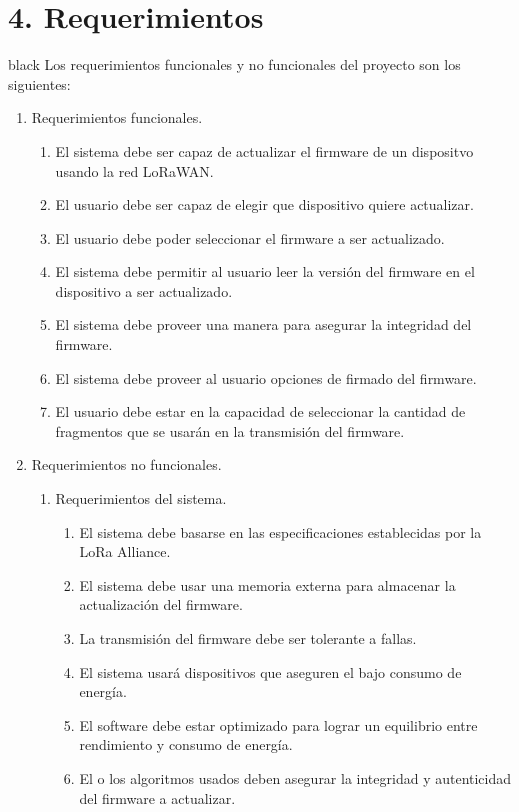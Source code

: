 \documentclass[11pt]{charter}
\begin{document}
\section{4. Requerimientos}
\label{sec:requerimientos}
\begin{consigna}{black}
Los requerimientos funcionales y no funcionales del proyecto son los siguientes:
\begin{enumerate}
\item Requerimientos funcionales.
	\begin{enumerate}
	\item El sistema debe ser capaz de actualizar el firmware de un dispositvo usando la red LoRaWAN.
	\item El usuario debe ser capaz de elegir que dispositivo quiere actualizar.
	\item El usuario debe poder seleccionar el firmware a ser actualizado.
	\item El sistema debe permitir al usuario leer la versión del firmware en el dispositivo a ser actualizado.
	\item El sistema debe proveer una manera para asegurar la integridad del firmware.
	\item El sistema debe proveer al usuario opciones de firmado del firmware.
	\item El usuario debe estar en la capacidad de seleccionar la cantidad de fragmentos que se usarán en la transmisión del firmware.
	\end{enumerate}
\item Requerimientos no funcionales.
	\begin{enumerate}
	\item Requerimientos del sistema.
	\begin{enumerate}
		\item El sistema debe basarse en las especificaciones establecidas por la LoRa Alliance\textregistered.
		\item El sistema debe usar una memoria externa para almacenar la actualización del firmware.
		\item La transmisión del firmware debe ser tolerante a fallas.
		\item El sistema usará dispositivos que aseguren el bajo consumo de energía.
		\item El software debe estar optimizado para lograr un equilibrio entre rendimiento y consumo de energía.
		\item El o los algoritmos usados deben asegurar la integridad y autenticidad del firmware a actualizar.

\end{enumerate}
\end{enumerate}
\end{enumerate}
\end{consigna}
\end{document}
